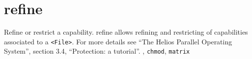 \section{refine}
\begin{man}
  \PP Refine or restrict a capability.
  \DE refine allows refining and restricting of capabilities associated
             to a {\tt <File>}. For more details see ``The Helios Parallel
             Operating System'', section 3.4, ``Protection: a tutorial''.
  , {\tt chmod}, {\tt matrix}
\end{man}
